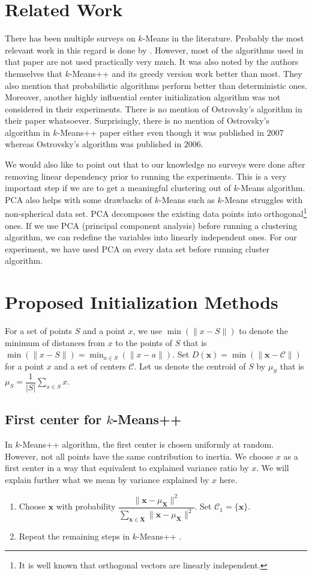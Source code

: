 \documentclass[twoside, 11pt]{article}
\newcommand{\x}{\mathbf{x}}
\newcommand{\X}{\mathbf{X}}
\newcommand{\C}{\mathcal{C}}
\begin{document}
	\section{Related Work}
	There has been multiple surveys on $k$-Means in the literature. Probably the most relevant work in this regard is done by \cite{celebi}. However, most of the algorithms used in that paper are not used practically very much. It was also noted by the authors themselves that $k$-Means++ and its greedy version work better than most. They also mention that probabilistic algorithms perform better than deterministic ones. Moreover, another highly influential center initialization algorithm \citep{ostrovsky} was not considered in their experiments. There is no mention of Ostrovsky's algorithm in their paper whatsoever. Surprisingly, there is no mention of Ostrovsky's algorithm in $k$-Means++ paper either even though it was published in $2007$ whereas Ostrovsky's algorithm was published in $2006$.
	
	We would also like to point out that to our knowledge no surveys were done after removing linear dependency prior to running the experiments. This is a very important step if we are to get a meaningful clustering out of $k$-Means algorithm. PCA also helps with some drawbacks of $k$-Means such as $k$-Means struggles with non-spherical data set. PCA decomposes the existing data points into orthogonal\footnote{It is well known that orthogonal vectors are linearly independent.} ones. If we use PCA (principal component analysis) before running a clustering algorithm, we can redefine the variables into linearly independent ones. For our experiment, we have used PCA on every data set before running cluster algorithm.
	\section{Proposed Initialization Methods}
	For a set of points $S$ and a point $x$, we use $\min(\|x-S\|)$ to denote the minimum of distances from $x$ to the points of $S$ that is $\min(\| x-S\|)=\min_{a\in S}(\| x-a\|)$. Set $D(\x)=\min(\|\x-\C\|)$ for a point $x$ and a set of centers $\C$. Let us denote the centroid of $S$ by $\mu_S$ that is $\mu_S=\dfrac{1}{|S|}\sum_{x\in S}x$.
	\subsection{First center for $k$-Means++}
	In $k$-Means++ algorithm, the first center is chosen uniformly at random. However, not all points have the same contribution to inertia. We choose $x$ as a first center in a way that equivalent to explained variance ratio by $x$. We will explain further what we mean by variance explained by $x$ here.
	\begin{enumerate}[i]
		\item Choose $\x$ with probability $\dfrac{\|\x-\mu_{\X}\|^2}{\sum_{\x\in\X}\|\x-\mu_{\X}\|^2}$. Set $\C_1=\{\x\}$.\label{step:first_center}
		\item Repeat the remaining steps in $k$-Means++ \cite[Section $2.2$, Page $3$]{kmeans++}.
	\end{enumerate}
\end{document}
